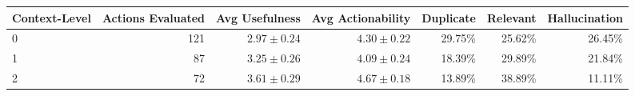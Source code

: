 \begin{tabular}{lrrrrrr}
\toprule
Context-Level & Actions Evaluated & Avg Usefulness & Avg Actionability & Duplicate & Relevant & Hallucination \\
\midrule
0 & 121 & \( 2.97 \pm 0.24 \) & \( 4.30 \pm 0.22 \) & 29.75\% & 25.62\% & 26.45\% \\
1 & 87 & \( 3.25 \pm 0.26 \) & \( 4.09 \pm 0.24 \) & 18.39\% & 29.89\% & 21.84\% \\
2 & 72 & \( 3.61 \pm 0.29 \) & \( 4.67 \pm 0.18 \) & 13.89\% & 38.89\% & 11.11\% \\
\bottomrule
\end{tabular}
